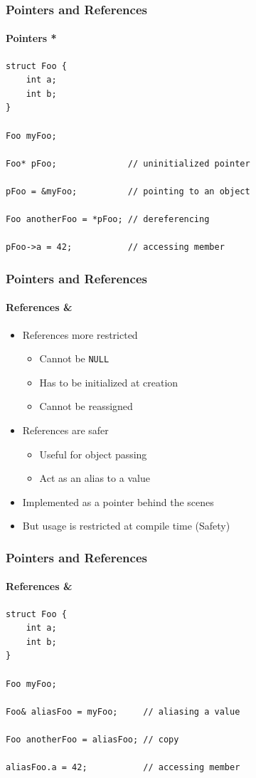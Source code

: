 \documentclass[table]{beamer}
\newcommand{\declarelesson}{\textbf{\color{themegreen}{Lesson:}} }
\begin{document}
\begin{frame}[fragile]
    \frametitle{\declarelesson Pointers and References}
    \framesubtitle{Pointers *}
    \begin{lstlisting}[title=Pointer Usage]
struct Foo {
    int a;
    int b;
}

Foo myFoo;

Foo* pFoo;              // uninitialized pointer

pFoo = &myFoo;          // pointing to an object

Foo anotherFoo = *pFoo; // dereferencing

pFoo->a = 42;           // accessing member
    \end{lstlisting}
\end{frame}

\begin{frame}
    \frametitle{\declarelesson Pointers and References}
    \framesubtitle{References \&}
    \begin{itemize}
        \item References more restricted
            \begin{itemize}
                \item Cannot be \texttt{NULL}
                \item Has to be initialized at creation
                \item Cannot be reassigned
            \end{itemize}
        \item References are safer
            \begin{itemize}
                \item Useful for object passing
                \item Act as an alias to a value
            \end{itemize}
        \item Implemented as a pointer behind the scenes
        \item But usage is restricted at compile time (\alert{Safety})
    \end{itemize}
\end{frame}

\begin{frame}[fragile]
    \frametitle{\declarelesson Pointers and References}
    \framesubtitle{References \&}
    \begin{lstlisting}[title=Reference Usage]
struct Foo {
    int a;
    int b;
}

Foo myFoo;

Foo& aliasFoo = myFoo;     // aliasing a value

Foo anotherFoo = aliasFoo; // copy

aliasFoo.a = 42;           // accessing member
    \end{lstlisting}
\end{frame}
\end{document}
